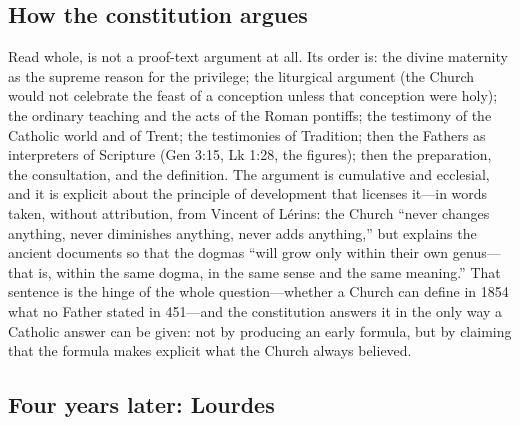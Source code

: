 \subsection*{How the constitution argues}

Read whole,  is not a proof-text argument at all.
Its order is: the divine maternity as the supreme reason for the
privilege; the liturgical argument (the Church would not celebrate the
feast of a conception unless that conception were holy); the ordinary
teaching and the acts of the Roman pontiffs; the testimony of the
Catholic world and of Trent; the testimonies of Tradition; then the
Fathers as interpreters of Scripture (Gen 3:15, Lk 1:28, the figures);
then the preparation, the consultation, and the definition. The argument
is cumulative and ecclesial, and it is explicit about the principle of
development that licenses it---in words taken, without attribution, from
Vincent of L\'erins: the Church ``never changes anything, never
diminishes anything, never adds anything,'' but explains the ancient
documents so that the dogmas ``will grow only within their own genus---
that is, within the same dogma, in the same sense and the same
meaning.'' That sentence is the hinge of the whole
question---whether a Church can define in 1854 what no Father stated in
451---and the constitution answers it in the only way a Catholic answer
can be given: not by producing an early formula, but by claiming that
the formula makes explicit what the Church always believed.

\subsection*{Four years later: Lourdes}

